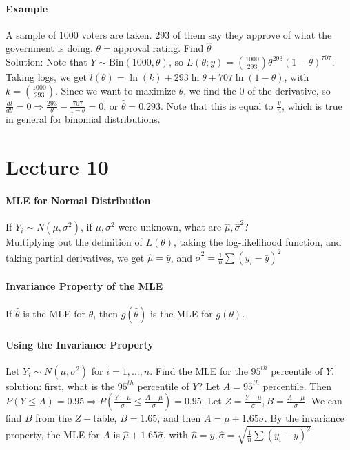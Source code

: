 \documentclass[10pt,letter]{article}
\theoremstyle{plain}
\theoremstyle{definition}
\begin{document}
\paragraph{Example}
A sample of 1000 voters are taken. 293 of them say they approve of what the government is doing. $\theta=$approval rating. Find $\hat{\theta}$ \\ 
Solution: Note that $Y\sim\text{Bin}(1000,\theta)$, so $L(\theta;y)=\binom{1000}{293}\theta^{293}(1-\theta)^{707}$. Taking logs, we get $l(\theta)=\ln(k)+293\ln\theta+707\ln(1-\theta)$, with $k=\binom{1000}{293}$. Since we want to maximize $\theta$, we find the $0$ of the derivative, so $\frac{dl}{d\theta}=0\Rightarrow\frac{293}{\theta}-\frac{707}{1-\theta}=0$, or $\hat\theta=0.293$. Note that this is equal to $\frac{y}{n}$, which is true in general for binomial distributions. 

\section*{Lecture 10}
\paragraph{MLE for Normal Distribution}
If $Y_i\sim N(\mu,\sigma^2)$, if $\mu,\sigma^2$ were unknown, what are $\hat\mu,\hat\sigma^2$? \\ 
Multiplying out the definition of $L(\theta)$, taking the log-likelihood function, and taking partial derivatives, we get $\hat\mu=\bar{y}$, and $\hat\sigma^2=\frac{1}{n}\sum(y_i-\bar{y})^2$
\paragraph{Invariance Property of the MLE}
If $\hat\theta$ is the MLE for $\theta$, then $g(\hat\theta)$ is the MLE for $g(\theta)$. 
\paragraph{Using the Invariance Property}
Let $Y_i\sim N(\mu,\sigma^2)$ for $i=1,\ldots,n$. Find the MLE for the $95^{th}$ percentile of $Y$. \\ 
solution: first, what is the $95^{th}$ percentile of $Y$? Let $A=95^{th}$ percentile. Then $P(Y\leq A)=0.95\Rightarrow P\left(\frac{Y-\mu}{\sigma}\leq\frac{A-\mu}{\sigma}\right)=0.95$. Let $Z=\frac{Y-\mu}{\sigma},B=\frac{A-\mu}{\sigma}$. We can find $B$ from the $Z-$table, $B=1.65$, and then $A=\mu+1.65\sigma$. By the invariance property, the MLE for $A$ is $\hat\mu+1.65\hat\sigma$, with $\hat\mu=\bar{y},\hat\sigma=\sqrt{\frac{1}{n}\sum(y_i-\bar{y})^2}$
\end{document}
